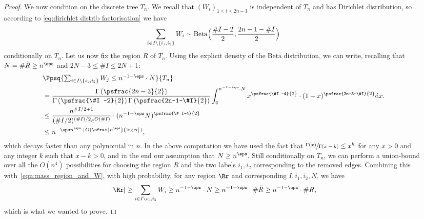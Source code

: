 \begin{proof}
We now condition on the discrete tree $T_n$. We recall that $(W_i)_{1\leq i \leq 2n-3}$ is independent of $T_n$ and has Dirichlet distribution, so according to \eqref{eq:dirichlet distrib factorisation} we have
\begin{align*}
\sum_{i\in I \setminus \{i_1,i_2\}} W_i
\sim \mathrm{Beta}\Bigl(\frac{\#I -2}{2},\frac{2n-1-\#I}{2}\Bigr)
\end{align*}
conditionally on $T_n$. Let us now fix the region $\tilde{R}$ of $T_n$. Using the explicit density of the $\mathrm{Beta}$ distribution, we can write, recalling that $N = \# \tilde{R} \geq n^\eps$ and $2N-3 \leq \# I \leq 2N+1$:
\begin{align*}
&\Ppsq{\textstyle\sum_{i\in I \setminus \{i_1,i_2\}} W_j \leq n^{-1-\eps}\cdot N}{T_n}\\
&= \frac{\Gamma\left(\psfrac{2n-3}{2}\right)}{\Gamma\left(\psfrac{\#I -2}{2}\right)\Gamma\left(\psfrac{2n-1-\#I}{2}\right)} \int_0^{n^{-1-\eps}\cdot N} x^{\psfrac{\#I -4}{2}} \cdot (1-x)^{\psfrac{2n-3-\#I}{2}} \mathrm{d}x.\\
&\leq \frac{n^{\#I/2+1}}{(\#I/2)^{(\#I)/2} e^{O(\#I)}} \cdot (n^{-1-\eps} N)^{\psfrac{\# I-4}{2}}\\
&\leq n^{-\eps n^{\eps}+O(\sfrac{n^\eps}{\log n})},
\end{align*}
which decays faster than any polynomial in $n$.
In the above computation we have used the fact that $\sfrac{\Gamma(x)}{\Gamma(x-k)}\leq x^k$ for any $x>0$ and any integer $k$ such that $x-k >0$, and in the end our assumption that $N\geq n^\eps$.
Still conditionally on $T_n$, we can perform a union-bound over all the $O(n^{4})$ possibilities for choosing the region $R$ and the two labels $i_1,i_2$ corresponding to the removed edges. Combining this with~\eqref{eqn:mass_region_and_W}, with high probability, for any region $\Rr$ and corresponding $I,i_1,i_2,N$, we have
\begin{align*}
|\Rr| \geq \sum_{i\in I\setminus {i_1,i_2}} W_i \geq n^{-1-\eps}\cdot N \geq n^{-1-\eps}\cdot \# \tilde{R} \geq n^{-1-\eps}\cdot \# R ,
\end{align*}
which is what we wanted to prove.
\end{proof}

\label{subsec:aldous recursive decomposition}

